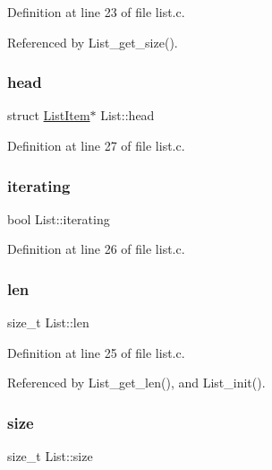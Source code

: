 Definition at line 23 of file list.\+c.



Referenced by List\+\_\+get\+\_\+size().

\mbox{\label{structList_abba5cd8966cc47ab6cb0b3cead7b5106}} 
\subsubsection{\texorpdfstring{head}{head}}
{\footnotesize\ttfamily struct \mbox{\hyperlink{structListItem}{List\+Item}}$\ast$ List\+::head}



Definition at line 27 of file list.\+c.

\mbox{\label{structList_ac4c33942be7f3c4ae0d6d836fc9aaf25}} 
\subsubsection{\texorpdfstring{iterating}{iterating}}
{\footnotesize\ttfamily bool List\+::iterating}



Definition at line 26 of file list.\+c.

\mbox{\label{structList_ac7c599366a5b35b3d8725df1b6239955}} 
\subsubsection{\texorpdfstring{len}{len}}
{\footnotesize\ttfamily size\+\_\+t List\+::len}



Definition at line 25 of file list.\+c.



Referenced by List\+\_\+get\+\_\+len(), and List\+\_\+init().

\mbox{\label{structList_a166530a166abd81afec0e6b0283f7e80}} 
\subsubsection{\texorpdfstring{size}{size}}
{\footnotesize\ttfamily size\+\_\+t List\+::size}




